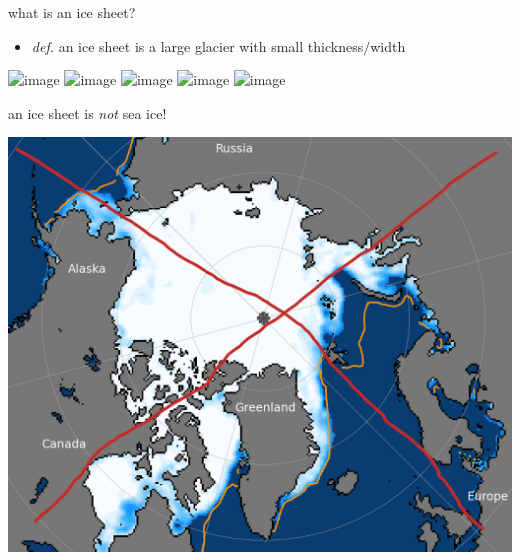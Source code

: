 \documentclass[svgnames,
               hyperref={colorlinks,citecolor=DeepPink4,linkcolor=FireBrick,urlcolor=Maroon},
               usepdftitle=false]  %
               {beamer}
\begin{document}
\begin{frame}{what is an ice sheet?}

\begin{itemize}
\item \emph{def.} an \alert{ice sheet} is a large glacier with small thickness$/$width
\end{itemize}

\bigskip
\begin{minipage}[t][60cm][t]{\textwidth}
\begin{center}
\includegraphics<1>[height=0.69\textheight]{../images/ant-pittard2021.png}
\includegraphics<2>[width=\textwidth]{../images/ant-schoofhewitt2013.png}
\includegraphics<3>[height=0.69\textheight]{../images/alps-seguinot2018.png}
\includegraphics<4>[height=0.69\textheight]{../images/moraines-indiana.jpg}
\includegraphics<5>[height=0.69\textheight]{../images/laurentide-margold2018.png}
\end{center}
\end{minipage}
\end{frame}


\begin{frame}{an ice sheet is \emph{not} sea ice!}
\begin{center}
\includegraphics[height=0.8\textheight]{../images/not-sea-ice.png}
\end{center}
\end{frame}
\end{document}
